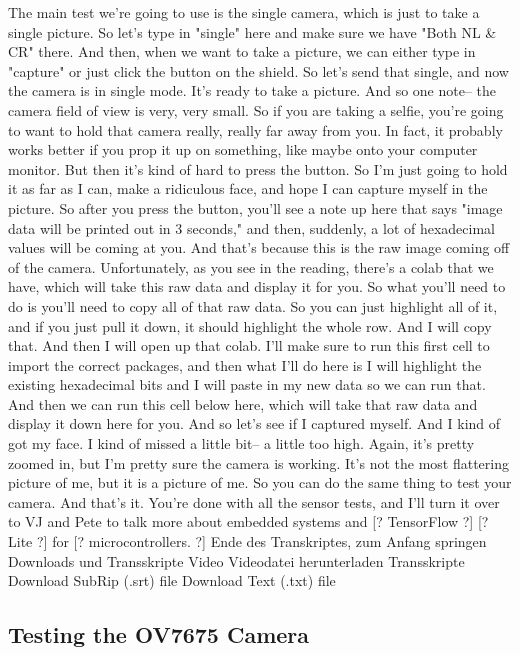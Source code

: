 The main test we're going to use is the single camera,
which is just to take a single picture.
So let's type in "single" here and make sure we have "Both NL \& CR" there.
And then, when we want to take a picture,
we can either type in "capture" or just click the button on the shield.
So let's send that single, and now the camera is in single mode.
It's ready to take a picture.
And so one note--
the camera field of view is very, very small.
So if you are taking a selfie, you're going
to want to hold that camera really, really far away from you.
In fact, it probably works better if you prop it up on something,
like maybe onto your computer monitor.
But then it's kind of hard to press the button.
So I'm just going to hold it as far as I can, make a ridiculous face,
and hope I can capture myself in the picture.
So after you press the button, you'll see a note
up here that says "image data will be printed out in 3 seconds,"
and then, suddenly, a lot of hexadecimal values will be coming at you.
And that's because this is the raw image coming off of the camera.
Unfortunately, as you see in the reading, there's a colab that we have,
which will take this raw data and display it for you.
So what you'll need to do is you'll need to copy all of that raw data.
So you can just highlight all of it, and if you just pull it down,
it should highlight the whole row.
And I will copy that.
And then I will open up that colab.
I'll make sure to run this first cell to import the correct packages,
and then what I'll do here is I will highlight the existing hexadecimal bits
and I will paste in my new data so we can run that.
And then we can run this cell below here, which will take that raw data
and display it down here for you.
And so let's see if I captured myself.
And I kind of got my face.
I kind of missed a little bit--
a little too high.
Again, it's pretty zoomed in, but I'm pretty sure the camera is working.
It's not the most flattering picture of me, but it is a picture of me.
So you can do the same thing to test your camera.
And that's it.
You're done with all the sensor tests, and I'll turn it over to VJ and Pete
to talk more about embedded systems and [? TensorFlow ?] [? Lite ?]
for [? microcontrollers. ?]
Ende des Transkriptes, zum Anfang springen
Downloads und Transskripte
Video
Videodatei herunterladen
Transskripte
Download SubRip (.srt) file
Download Text (.txt) file


\subsection{Testing the OV7675 Camera}

